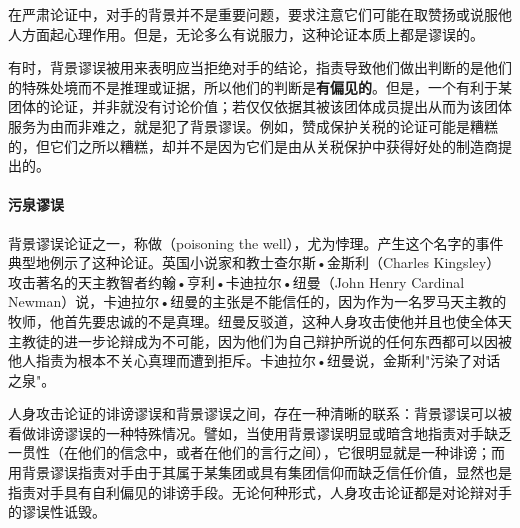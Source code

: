 在严肃论证中，对手的背景并不是重要问题，要求注意它们可能在取赞扬或说服他人方面起心理作用。但是，无论多么有说服力，这种论证本质上都是谬误的。

有时，背景谬误被用来表明应当拒绝对手的结论，指责导致他们做出判断的是他们的特殊处境而不是推理或证据，所以他们的判断是\textbf{有偏见的}。但是，一个有利于某团体的论证，并非就没有讨论价值；若仅仅依据其被该团体成员提出从而为该团体服务为由而非难之，就是犯了背景谬误。例如，赞成保护关税的论证可能是糟糕的，但它们之所以糟糕，却并不是因为它们是由从关税保护中获得好处的制造商提出的。

\paragraph{污泉谬误}
\begin{examplebox}[title=污泉谬误的经典案例]
背景谬误论证之一，称做（poisoning the well），尤为悖理。产生这个名字的事件典型地例示了这种论证。英国小说家和教士查尔斯•金斯利（Charles Kingsley）攻击著名的天主教智者约翰•亨利•卡迪拉尔•纽曼（John Henry Cardinal Newman）说，卡迪拉尔•纽曼的主张是不能信任的，因为作为一名罗马天主教的牧师，他首先要忠诚的不是真理。纽曼反驳道，这种人身攻击使他并且也使全体天主教徒的进一步论辩成为不可能，因为他们为自己辩护所说的任何东西都可以因被他人指责为根本不关心真理而遭到拒斥。卡迪拉尔•纽曼说，金斯利"污染了对话之泉"。
\end{examplebox}

人身攻击论证的诽谤谬误和背景谬误之间，存在一种清晰的联系：背景谬误可以被看做诽谤谬误的一种特殊情况。譬如，当使用背景谬误明显或暗含地指责对手缺乏一贯性（在他们的信念中，或者在他们的言行之间），它很明显就是一种诽谤；而用背景谬误指责对手由于其属于某集团或具有集团信仰而缺乏信任价值，显然也是指责对手具有自利偏见的诽谤手段。无论何种形式，人身攻击论证都是对论辩对手的谬误性诋毁。